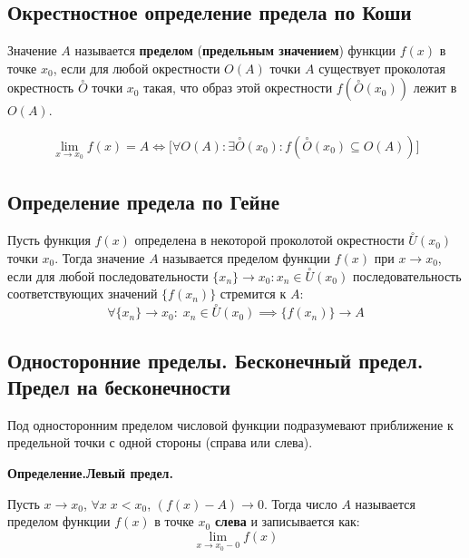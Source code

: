 \documentclass[a4paper,12pt,oneside]{extbook}
\newcommand{\newpar}{$ $\par\nobreak\ignorespaces}
\newenvironment{definition}[1][]{\noindent\textbf{Определение.\if\relax\detokenize{#1}\relax\else\;#1.\fi}\newpar}{\bigskip}
\theoremstyle{numbered}
\theoremstyle{unnumbered}
\theoremstyle{named}
\theoremstyle{unnumbered}
\theoremstyle{named}
\theoremstyle{named}
\theoremstyle{named}
\begin{document}
\subsection{Окрестностное определение предела по Коши}
Значение \(A\) называется \textbf{пределом} (\textbf{предельным значением}) функции \(f(x)\) в точке \(x_0\), если для любой окрестности \(O(A)\) точки \(A\) существует проколотая окрестность \(\overset{\circ}{O}\) точки \(x_0\) такая, что образ этой окрестности \(f(\overset{\circ}{O}(x_0))\) лежит в \(O(A)\).

\begin{gather*}
    \lim_{x \to x_0}{f(x)} = A \iff \Big[ \forall O(A): \exists \overset{\circ}{O}(x_0): f(\overset{\circ}{O}(x_0) \subseteq O(A)) \Big]
\end{gather*}

\subsection{Определение предела по Гейне}%
\label{sub:Определение предела по Гейне}
Пусть функция \(f(x)\) определена в некоторой проколотой окрестности \(\overset{\circ}{U}(x_0)\) точки \(x_0\). Тогда значение \(A\) называется пределом функции \(f(x)\) при \(x \to x_0\), если для любой последовательности \(\{x_n\} \to x_0: x_n \in \overset{\circ}{U}(x_0)\) последовательность соответствующих значений \(\{f(x_n)\}\) стремится к \(A\):
\[
    \forall \{x_n\} \to x_0:\; x_n \in \overset{\circ}{U}(x_0) \implies \{f(x_n)\} \to A
\]

\subsection{Односторонние пределы. Бесконечный предел. Предел на бесконечности}%
\label{sub:Односторонние пределы. Бесконечный предел. Предел на бесконечности}

\begin{siderules}
    Под односторонним пределом числовой функции подразумевают приближение к предельной точки с одной стороны (справа или слева).
\end{siderules}

\begin{definition}[Левый предел]
    Пусть \(x \to x_0\), \(\forall x \; x < x_0\), \((f(x) - A) \to 0\). Тогда число \(A\) называется пределом функции \(f(x)\) в точке \(x_0\) \textbf{слева} и записывается как:
    \[
        \lim_{x \to x_0 - 0}{f(x)}
    \]
\end{definition}
\end{document}
